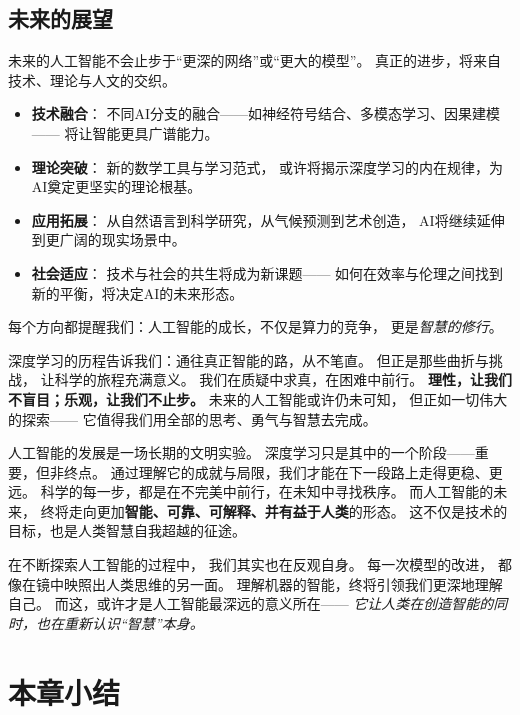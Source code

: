 \subsection{未来的展望}  
未来的人工智能不会止步于“更深的网络”或“更大的模型”。  
真正的进步，将来自技术、理论与人文的交织。  
\begin{itemize}
\item \textbf{技术融合}：  
  不同AI分支的融合——如神经符号结合、多模态学习、因果建模——  
  将让智能更具广谱能力。  
\item \textbf{理论突破}：  
  新的数学工具与学习范式，  
  或许将揭示深度学习的内在规律，为AI奠定更坚实的理论根基。  
\item \textbf{应用拓展}：  
  从自然语言到科学研究，从气候预测到艺术创造，  
  AI将继续延伸到更广阔的现实场景中。  
\item \textbf{社会适应}：  
  技术与社会的共生将成为新课题——  
  如何在效率与伦理之间找到新的平衡，将决定AI的未来形态。  
\end{itemize}
每个方向都提醒我们：人工智能的成长，不仅是算力的竞争，  
更是\textit{智慧的修行}。

深度学习的历程告诉我们：通往真正智能的路，从不笔直。  
但正是那些曲折与挑战，  
让科学的旅程充满意义。  
我们在质疑中求真，在困难中前行。  
\textbf{理性，让我们不盲目；乐观，让我们不止步。}  
未来的人工智能或许仍未可知，  
但正如一切伟大的探索——  
它值得我们用全部的思考、勇气与智慧去完成。

人工智能的发展是一场长期的文明实验。  
深度学习只是其中的一个阶段——重要，但非终点。  
通过理解它的成就与局限，我们才能在下一段路上走得更稳、更远。  
科学的每一步，都是在不完美中前行，在未知中寻找秩序。  
而人工智能的未来，  
终将走向更加\textbf{智能、可靠、可解释、并有益于人类}的形态。  
这不仅是技术的目标，也是人类智慧自我超越的征途。

在不断探索人工智能的过程中，  
我们其实也在反观自身。  
每一次模型的改进，  
都像在镜中映照出人类思维的另一面。  
理解机器的智能，终将引领我们更深地理解自己。  
而这，或许才是人工智能最深远的意义所在——  
\textit{它让人类在创造智能的同时，也在重新认识“智慧”本身。}

\section{本章小结}
